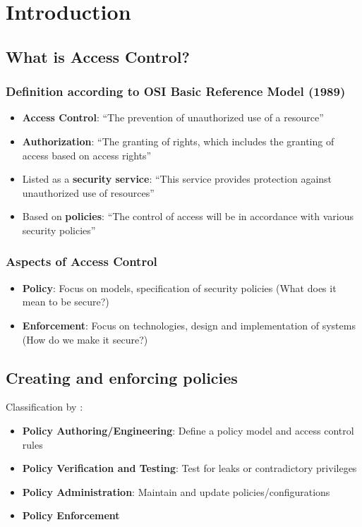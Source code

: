 \documentclass[12pt,A4]{extarticle}
\begin{document}
\disclaimer{}

\tableofcontents
\clearpage

\section{Introduction}
\subsection{What is Access Control?}
\subsubsection{Definition according to OSI Basic Reference Model (1989)}
\begin{itemize}
  \item{\textbf{Access Control}: ``The prevention of unauthorized use of a resource''}
  \item{\textbf{Authorization}: ``The granting of rights, which includes the granting of access based on access rights''}
  \item{Listed as a \textbf{security service}: ``This service provides protection against unauthorized use of resources''}
  \item{Based on \textbf{policies}: ``The control of access will be in accordance with various security policies''}
\end{itemize}

\subsubsection{Aspects of Access Control}
\begin{itemize}
  \item{\textbf{Policy}: Focus on models, specification of security policies (What does it mean to be secure?)}
  \item{\textbf{Enforcement}: Focus on technologies, design and implementation of systems (How do we make it secure?)}
\end{itemize}

\subsection{Creating and enforcing policies}
Classification by \cite{nobi2022towards}:
\begin{itemize}
  \item{\textbf{Policy Authoring/Engineering}: Define a policy model and access control rules}
  \item{\textbf{Policy Verification and Testing}: Test for leaks or contradictory privileges}
  \item{\textbf{Policy Administration}: Maintain and update policies/configurations}
  \item{\textbf{Policy Enforcement}}
\end{itemize}
\end{document}
